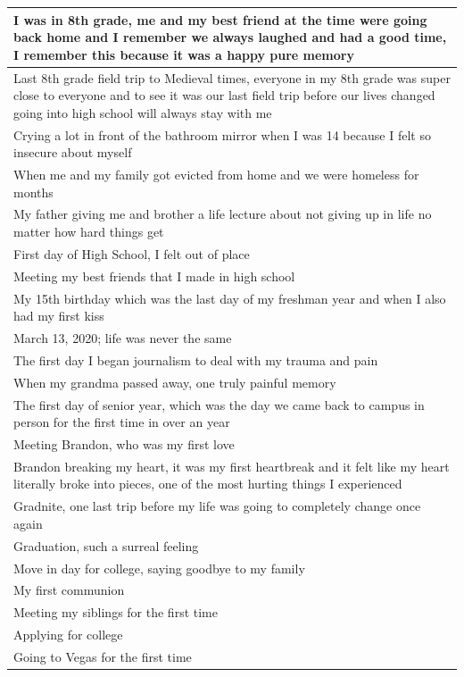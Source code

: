 \documentclass[
  .7em,
  letterpaper,
  DIV=11,
  numbers=noendperiod]{scrartcl}
\begin{document}
\begin{table}
\begin{tabular}{l}
\hline
I was in 8th grade, me and my best friend at the time were going back home and I remember we always laughed and had a good time, I remember this because it was a happy pure memory\\
\hline
Last 8th grade field trip to Medieval times, everyone in my 8th grade was super close to everyone and to see it was our last field trip before our lives changed going into high school will always stay with me\\
\hline
Crying a lot in front of the bathroom mirror when I was 14 because I felt so insecure about myself\\
\hline
When me and my family got evicted from home and we were homeless for months\\
\hline
My father giving me and brother a life lecture about not giving up in life no matter how hard things get\\
\hline
First day of High School, I felt out of place\\
\hline
Meeting my best friends that I made in high school\\
\hline
My 15th birthday which was the last day of my freshman year and when I also had my first kiss\\
\hline
March 13, 2020; life was never the same\\
\hline
The first day I began journalism to deal with my trauma and pain\\
\hline
When my grandma passed away, one truly painful memory\\
\hline
The first day of senior year, which was the day we came back to campus in person for the first time in over an year\\
\hline
Meeting Brandon, who was my first love\\
\hline
Brandon breaking my heart, it was my first heartbreak and it felt like my heart literally broke into pieces, one of the most hurting things I experienced\\
\hline
Gradnite, one last trip before my life was going to completely change once again\\
\hline
Graduation, such a surreal feeling\\
\hline
Move in day for college, saying goodbye to my family\\
\hline
My first communion\\
\hline
Meeting my siblings for the first time\\
\hline
Applying for college\\
\hline
Going to Vegas for the first time\\

\end{tabular}
\end{table}
\end{document}
